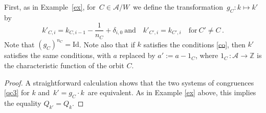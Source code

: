 \documentclass{amsart}
\newtheorem{prop}[theorem]{Proposition}
\theoremstyle{definition}
\theoremstyle{remark}
\numberwithin{equation}{section}
\begin{document}
\medskip

First, as in Example~\ref{ex}, for $\,C\in {\mathcal{A}}/W\,$ we define
the transformation $\,g_C: k\mapsto k'\,$ by
\begin{equation}
\label{gh} k'_{C, i}=k_{C, i-1}-\frac{1}{n_C}+\delta_{i,0}\
\text{and}\quad k'_{C',i}=k_{C',i}\quad\text{for}\ C'\ne C\,.
\end{equation}
Note that $(g_C)^{n_C}= {\mathrm{Id}} $. Note also that if $k$ satisfies
the conditions \eqref{co}, then $k'$ satisfies the same
conditions, with $a$ replaced by $ a' := a-1_C $, where $1_C\,: {\mathcal{A}}\to {\mathbb{Z}}$
is the characteristic function of the orbit $C$.

\begin{proof}
A straightforward calculation shows that the two systems of congruences
\eqref{qc3} for $k$ and $\,k' = g_C \cdot k\,$ are equivalent.
As in Example \ref{ex} above, this implies the
equality $ Q_{k'} = Q_k $.
\end{proof}
\medskip
\end{document}
